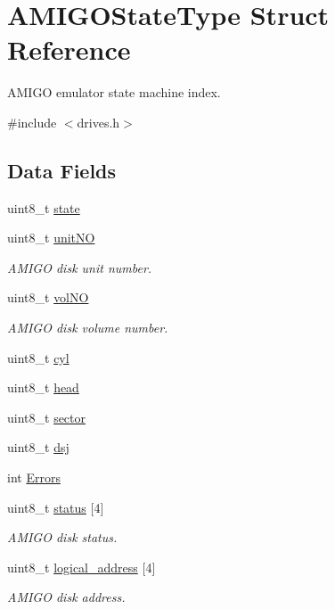 \hypertarget{structAMIGOStateType}{}\section{A\+M\+I\+G\+O\+State\+Type Struct Reference}
\label{structAMIGOStateType}


A\+M\+I\+GO emulator state machine index.  




{\ttfamily \#include $<$drives.\+h$>$}

\subsection*{Data Fields}
\begin{DoxyCompactItemize}
\item 
uint8\+\_\+t \hyperlink{structAMIGOStateType_ab3ba7202566a784c93d437960f8f332e}{state}
\item 
uint8\+\_\+t \hyperlink{structAMIGOStateType_a3d0cc02f8822c817feddf93dd08a5034}{unit\+NO}
\begin{DoxyCompactList}\small\item\em A\+M\+I\+GO disk unit number. \end{DoxyCompactList}\item 
uint8\+\_\+t \hyperlink{structAMIGOStateType_a9825e282ac5844225a43b7f0835da67f}{vol\+NO}
\begin{DoxyCompactList}\small\item\em A\+M\+I\+GO disk volume number. \end{DoxyCompactList}\item 
uint8\+\_\+t \hyperlink{structAMIGOStateType_a54b4a4f8221f9d38fb93f2d23a40e305}{cyl}
\item 
uint8\+\_\+t \hyperlink{structAMIGOStateType_a92b01a4e3912d2fcacebcc15a21c66c9}{head}
\item 
uint8\+\_\+t \hyperlink{structAMIGOStateType_a90615dad99e4fb6852b176bf6712f40b}{sector}
\item 
uint8\+\_\+t \hyperlink{structAMIGOStateType_ab2294deecb44cdb1675e4096dba22eb1}{dsj}
\item 
int \hyperlink{structAMIGOStateType_ad04b5b3ffd8fabff547e6498d534feac}{Errors}
\item 
uint8\+\_\+t \hyperlink{structAMIGOStateType_a20ecb3cbbcb1fe4746c2d38edc125412}{status} \mbox{[}4\mbox{]}
\begin{DoxyCompactList}\small\item\em A\+M\+I\+GO disk status. \end{DoxyCompactList}\item 
uint8\+\_\+t \hyperlink{structAMIGOStateType_a924a685ad68765a91714aa6ad4b20d9f}{logical\+\_\+address} \mbox{[}4\mbox{]}
\begin{DoxyCompactList}\small\item\em A\+M\+I\+GO disk address. \end{DoxyCompactList}\end{DoxyCompactItemize}


